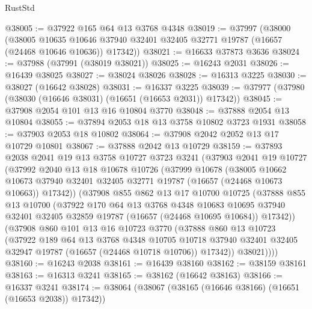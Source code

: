 \begin{lexlean}{RustStd}
\begin{coremodule}
@38005 := @37922 @165 @64 @13 @3768 @4348
@38019 := @37997
    (@38000
      (@38005
        @10635
        @10646
        @37940
        @32401
        @32405
        @32771
        @19787
        (@16657 (@24468 @10646 @10636))
        @17342))
@38021 := @16633 @37873 @3636
@38024 := @37988 (@37991 (@38019 @38021))
@38025 := @16243 @2031
@38026 := @16439 @38025
@38027 := @38024 @38026
@38028 := @16313 @3225
@38030 := @38027 (@16642 @38028)
@38031 := @16337 @3225
@38039 := @37977 (@37980 (@38030 (@16646 @38031) (@16651 (@16653 @2031)) @17342))
@38045 := @37908 @2054 @101 @13 @16 @10804 @3770
@38048 := @37888 @2054 @13 @10804
@38055 := @37894 @2053 @18 @13 @3758 @10802 @3723 @1931
@38058 := @37903 @2053 @18 @10802
@38064 := @37908 @2042 @2052 @13 @17 @10729 @10801
@38067 := @37888 @2042 @13 @10729
@38159 := @37893
    @2038
    @2041
    @19
    @13
    @3758
    @10727
    @3723
    @3241
    (@37903
      @2041
      @19
      @10727
      (@37992
        @2040
        @13
        @18
        @10678
        @10726
        (@37999
          @10678
          (@38005
            @10662
            @10673
            @37940
            @32401
            @32405
            @32771
            @19787
            (@16657 (@24468 @10673 @10663))
            @17342))
        (@37908
          @855
          @862
          @13
          @17
          @10700
          @10725
          (@37888
            @855
            @13
            @10700
            (@37922
              @170
              @64
              @13
              @3768
              @4348
              @10683
              @10695
              @37940
              @32401
              @32405
              @32859
              @19787
              (@16657 (@24468 @10695 @10684))
              @17342))
          (@37908
            @860
            @101
            @13
            @16
            @10723
            @3770
            (@37888
              @860
              @13
              @10723
              (@37922
                @189
                @64
                @13
                @3768
                @4348
                @10705
                @10718
                @37940
                @32401
                @32405
                @32947
                @19787
                (@16657 (@24468 @10718 @10706))
                @17342))
            @38021))))
@38160 := @16243 @2038
@38161 := @16439 @38160
@38162 := @38159 @38161
@38163 := @16313 @3241
@38165 := @38162 (@16642 @38163)
@38166 := @16337 @3241
@38174 := @38064 (@38067 (@38165 (@16646 @38166) (@16651 (@16653 @2038)) @17342))

\end{coremodule}
\end{lexlean}
